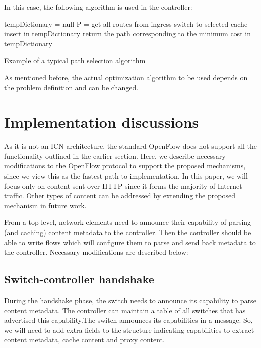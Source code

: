\documentclass[conference]{IEEEtran}
\begin{document}
In this case, the following algorithm is used in the controller:
\begin{algorithm}
\begin{algorithmic}
    \State tempDictionary = null
    \State P = get all routes from ingress switch to selected cache
    \For{}
        \State 
        \For{}
            \State 
        \EndFor
        \State insert  in tempDictionary
    \EndFor
    \State return the path corresponding to the minimum cost in tempDictionary
\end{algorithmic}
\caption{Example of a typical path selection algorithm}
\end{algorithm}

As mentioned before, the actual optimization algorithm to
be used depends on the problem definition and can be changed.

\section{Implementation discussions}
\label{sec:implementation}
As it is not an ICN architecture, the standard OpenFlow does
not support all the functionality outlined in the earlier section.
Here, we describe necessary modifications to the OpenFlow
protocol to support the proposed mechanisms, since we view
this as the fastest path to implementation. In this paper, we
will focus only on content sent over HTTP since it forms
the majority of Internet traffic. Other types of content can
be addressed by extending the proposed mechanism in future
work.

From a top level, network elements need to announce their
capability of parsing (and caching) content metadata to the
controller. Then the controller should be able to write flows
which will configure them to parse and send back metadata to
the controller. Necessary modifications are described below:
\subsection{Switch-controller handshake}
During the handshake phase, the switch needs to announce its capability to parse content metadata. The controller can maintain a table of all switches that has advertised this capability.The switch announces its capabilities in a  message. So, we will need to add extra fields to the  structure indicating capabilities to extract content metadata, cache content and proxy content.
\end{document}
